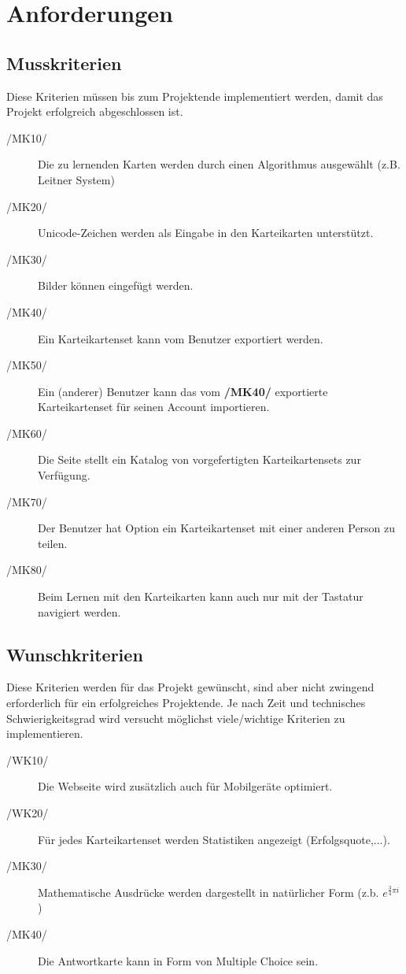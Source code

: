 \section{Anforderungen}

\subsection{Musskriterien}
Diese Kriterien müssen bis zum Projektende implementiert werden, damit das Projekt erfolgreich abgeschlossen ist.

\begin{description}
	\item[/MK10/] Die zu lernenden Karten werden durch einen Algorithmus ausgewählt (z.B. Leitner System)
	\item[/MK20/] Unicode-Zeichen werden als Eingabe in den Karteikarten unterstützt.
	\item[/MK30/] Bilder können eingefügt werden.
	\item[/MK40/] Ein Karteikartenset kann vom Benutzer exportiert werden.
	\item[/MK50/] Ein (anderer) Benutzer kann das vom \textbf{/MK40/} exportierte Karteikartenset für seinen Account importieren.
	\item[/MK60/] Die Seite stellt ein Katalog von vorgefertigten Karteikartensets zur Verfügung.
	\item[/MK70/] Der Benutzer hat Option ein Karteikartenset mit einer anderen Person zu teilen.
	\item[/MK80/] Beim Lernen mit den Karteikarten kann auch nur mit der Tastatur navigiert werden.
\end{description}

\subsection{Wunschkriterien}
Diese Kriterien werden für das Projekt gewünscht, sind aber nicht zwingend erforderlich für ein erfolgreiches Projektende. Je nach Zeit und technisches Schwierigkeitsgrad wird versucht möglichst viele/wichtige Kriterien zu implementieren.

\begin{description}
	\item[/WK10/] Die Webseite wird zusätzlich auch für Mobilgeräte optimiert.
	\item[/WK20/] Für jedes Karteikartenset werden Statistiken angezeigt (Erfolgsquote,...).
	\item[/MK30/] Mathematische Ausdrücke werden dargestellt in natürlicher Form (z.b. \( e^{\frac{3}{4}\pi i}\))
	\item[/MK40/] Die Antwortkarte kann in Form von Multiple Choice sein.
\end{description}

